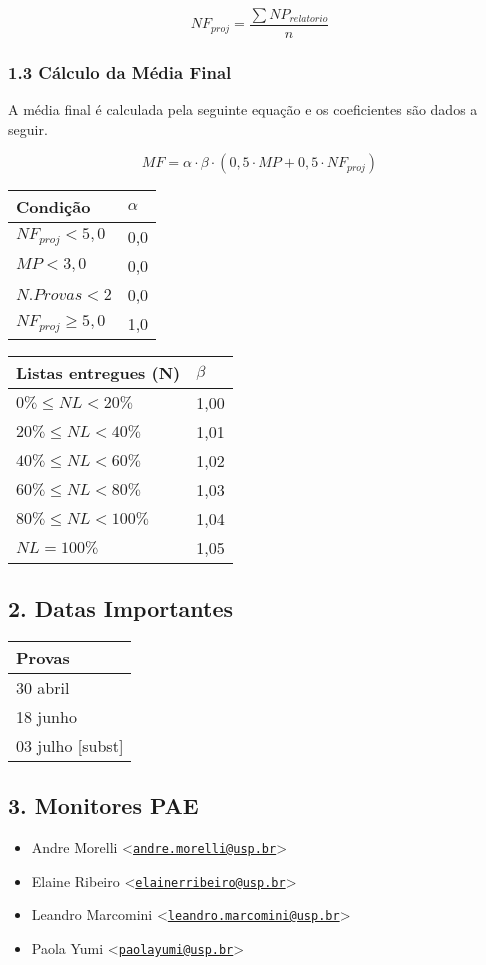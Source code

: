 \documentclass[
]{article}
\providecommand{\tightlist}{%
  \setlength{\itemsep}{0pt}\setlength{\parskip}{0pt}}
\begin{document}
\[NF_{proj} = \frac{\sum NP_{relatorio}}{n}\]

\hypertarget{cuxe1lculo-da-muxe9dia-final}{%
\subsubsection{1.3 Cálculo da Média
Final}\label{cuxe1lculo-da-muxe9dia-final}}

A média final é calculada pela seguinte equação e os coeficientes são
dados a seguir.

\[ MF = \alpha \cdot \beta \cdot (0,5 \cdot MP + 0,5 \cdot NF_{proj}) \]

\begin{longtable}[]{@{}ll@{}}
\toprule
Condição & \(\alpha\)\tabularnewline
\midrule
\endhead
\(NF_{proj} < 5,0\) & 0,0\tabularnewline
\(MP < 3,0\) & 0,0\tabularnewline
\(N.Provas < 2\) & 0,0\tabularnewline
\(NF_{proj} \geq 5,0\) & 1,0\tabularnewline
\bottomrule
\end{longtable}

\begin{longtable}[]{@{}ll@{}}
\toprule
Listas entregues (N) & \(\beta\)\tabularnewline
\midrule
\endhead
\(0\% \leq NL \lt 20\%\) & 1,00\tabularnewline
\(20\% \leq NL \lt 40\%\) & 1,01\tabularnewline
\(40\% \leq NL \lt 60\%\) & 1,02\tabularnewline
\(60\% \leq NL \lt 80\%\) & 1,03\tabularnewline
\(80\% \leq NL \lt 100\%\) & 1,04\tabularnewline
\(NL = 100\%\) & 1,05\tabularnewline
\bottomrule
\end{longtable}

\hypertarget{datas-importantes}{%
\subsection{2. Datas Importantes}\label{datas-importantes}}

\begin{longtable}[]{@{}l@{}}
\toprule
Provas\tabularnewline
\midrule
\endhead
30 abril\tabularnewline
18 junho\tabularnewline
03 julho {[}subst{]}\tabularnewline
\bottomrule
\end{longtable}

\hypertarget{monitores-pae}{%
\subsection{3. Monitores PAE}\label{monitores-pae}}

\begin{itemize}
\tightlist
\item
  Andre Morelli
  \textless{}\href{mailto:andre.morelli@usp.br}{\nolinkurl{andre.morelli@usp.br}}\textgreater{}
\item
  Elaine Ribeiro
  \textless{}\href{mailto:elainerribeiro@usp.br}{\nolinkurl{elainerribeiro@usp.br}}\textgreater{}
\item
  Leandro Marcomini
  \textless{}\href{mailto:leandro.marcomini@usp.br}{\nolinkurl{leandro.marcomini@usp.br}}\textgreater{}
\item
  Paola Yumi
  \textless{}\href{mailto:paolayumi@usp.br}{\nolinkurl{paolayumi@usp.br}}\textgreater{}
\end{itemize}
\end{document}

